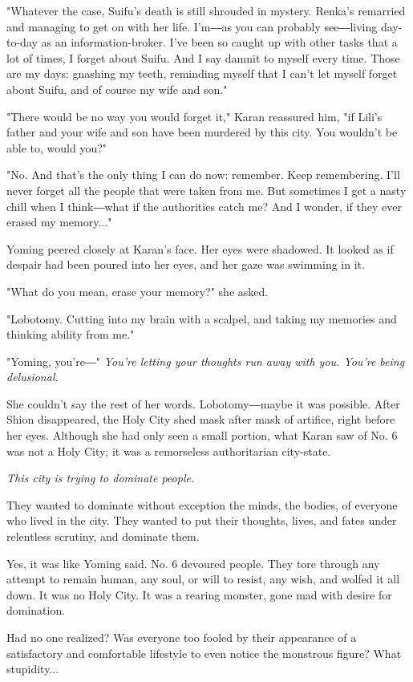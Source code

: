 "Whatever the case, Suifu's death is still shrouded in mystery. Renka's
remarried and managing to get on with her life. I'm―as you can probably
see―living day-to-day as an information-broker. I've been so caught up
with other tasks that a lot of times, I forget about Suifu. And I say
damnit to myself every time. Those are my days: gnashing my teeth,
reminding myself that I can't let myself forget about Suifu, and of
course my wife and son."

"There would be no way you would forget it," Karan reassured him, "if
Lili's father and your wife and son have been murdered by this city. You
wouldn't be able to, would you?"

"No. And that's the only thing I can do now: remember. Keep remembering.
I'll never forget all the people that were taken from me. But sometimes
I get a nasty chill when I think―what if the authorities catch me? And I
wonder, if they ever erased my memory..."

Yoming peered closely at Karan's face. Her eyes were shadowed. It looked
as if despair had been poured into her eyes, and her gaze was swimming
in it.

"What do you mean, erase your memory?" she asked.

"Lobotomy. Cutting into my brain with a scalpel, and taking my memories
and thinking ability from me."

"Yoming, you're―" \emph{You're letting your thoughts run away with you. You're
being delusional.}

She couldn't say the rest of her words. Lobotomy―maybe it was possible.
After Shion disappeared, the Holy City shed mask after mask of artifice,
right before her eyes. Although she had only seen a small portion, what
Karan saw of No. 6 was not a Holy City; it was a remorseless
authoritarian city-state.

\emph{This city is trying to dominate people.}

They wanted to dominate without exception the minds, the bodies, of
everyone who lived in the city. They wanted to put their thoughts,
lives, and fates under relentless scrutiny, and dominate them.

Yes, it was like Yoming said. No. 6 devoured people. They tore through
any attempt to remain human, any soul, or will to resist, any wish, and
wolfed it all down. It was no Holy City. It was a rearing monster, gone
mad with desire for domination.

Had no one realized? Was everyone too fooled by their appearance of a
satisfactory and comfortable lifestyle to even notice the monstrous
figure? What stupidity...

